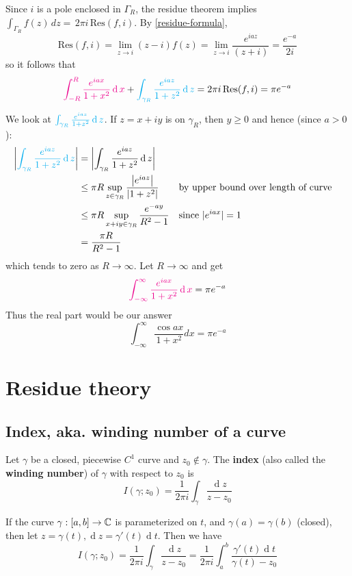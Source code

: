 \documentclass[12pt]{article}
\renewcommand{\d}{\ensuremath{\operatorname{d}}}
\begin{document}
Since $i$ is a pole enclosed in $\Gamma_R$, the residue theorem implies \(\int_{\Gamma_{R}}f(z)\,d z=\,2\pi i\,\mathrm{Res}(f,i)\). By \cref{residue-formula}, \[\mathrm{Res}(f,i)=\operatorname*{lim}_{z\rightarrow i}(z-i)f(z)=\operatorname*{lim}_{z\rightarrow i}\frac{e^{i a z}}{(z+i)}=\frac{e^{-a}}{2i}\] so it follows that 
\[\rt{\int_{-R}^{R}{\frac{e^{i a x}}{1+x^{2}}}\d x}+\bt{\int_{\gamma_{R}}{\frac{e^{i a z}}{1+z^{2}}}\d z}=2\pi i\,\mathrm{Res}(f,i)=\pi e^{-a}\]

We look at $\bt{\int_{\gamma_{R}}{\frac{e^{i a z}}{1+z^{2}}}\d z}$. If $z=x+i y$ is on $\gamma_R$, then $y \geq 0$ and hence (since $a>0$):
\[\begin{aligned}
    \left|\bt{\int_{\gamma_{R}}{\frac{e^{i a z}}{1+z^{2}}}\d z}\right| & =\left|\int_{\gamma_R} \frac{e^{i a z}}{1+z^2} \d z\right| \\
    & \leq \pi R \sup _{z \in \gamma_R} \frac{\left|e^{i a z}\right|}{\left|1+z^2\right|} &&\text{by upper bound over length of curve}\\
    & \leq \pi R \sup _{x+i y \in \gamma_R} \frac{e^{-a y}}{R^2-1} &&\text{since }|e^{iax}|=1\\
    & =\frac{\pi R}{R^2-1}
    \end{aligned}\]
which tends to zero as $R \rightarrow \infty$.
Let $R \rightarrow \infty$ and get \[\rt{\int_{-\infty}^{\infty} \frac{e^{i a x}}{1+x^2} \d x}=\pi e^{-a}\] Thus the real part would be our answer \[\int_{-\infty}^{\infty} \frac{\cos a x}{1+x^2} d x=\pi e^{-a}\]

\section{Residue theory}
\subsection{Index, aka. winding number of a curve}
 Let $\gamma$ be a closed, piecewise $C^1$ curve and $z_0\notin \gamma$. The \textbf{index} (also called the \textbf{winding number}) of $\gamma$ with respect to $z_0$ is \[I(\gamma;z_0)=\frac{1}{2\pi i}\int_{\gamma}\frac{\d z}{z-z_0}\]

\rmk If the curve $\gamma:[a,b]\to \mathbb{C}$ is parameterized on $t$, and $\gamma(a)=\gamma(b)$ (closed), then let $z=\gamma(t), \d z=\gamma'(t)\d t$. Then we have \[I(\gamma;z_0)=\frac{1}{2\pi i}\int_{\gamma}\frac{\d z}{z-z_0} = \frac{1}{2\pi i}\int_{a}^{b}\frac{\gamma'(t)\d t}{\gamma(t)-z_0}\]
\end{document}
